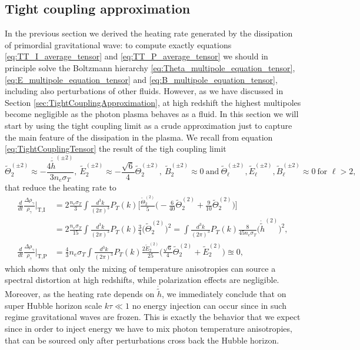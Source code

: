\subsection{Tight coupling approximation}
In the previous section we derived the heating rate generated by the dissipation of primordial gravitational wave: to compute exactly equations \eqref{eq:TT_I_average_tensor} and \eqref{eq:TT_P_average_tensor} we should in principle solve the Boltzmann hierarchy \eqref{eq:Theta_multipole_equation_tensor}, \eqref{eq:E_multipole_equation_tensor} and \eqref{eq:B_multipole_equation_tensor}, including also perturbations of other fluids. However, as we have discussed in Section \ref{sec:TightCouplingApproximation}, at high redshift the highest multipoles become negligible as the photon plasma behaves as a fluid. In this section we will start by using the tight coupling limit as a crude approximation just to capture the main feature of the dissipation in the plasma. We recall from equation \eqref{eq:TightCouplingTensor} the result of the tigh coupling limit
$$
\tilde\Theta_2^{(\pm2)}\approx-\frac{4\dot{\tilde h}^{(\pm2)}}{3n_e\sigma_T},\ \tilde E_2^{(\pm2)}\approx-\frac{\sqrt{6}}{4}\tilde\Theta_2^{(\pm2)},\ \tilde B_{2}^{(\pm2)}\approx0\ \text{and}\ \tilde \Theta_{\ell}^{(\pm2)},\tilde E_{\ell}^{(\pm2)},\tilde B_{\ell}^{(\pm2)}\approx 0\ \text{for }\ell>2,
$$
that reduce the heating rate to
\begin{align}\nonumber
    \frac{d}{dt}\frac{\Delta\rho_\gamma}{\rho_\gamma}\bigg|_\text{T,I}&=2\frac{n_e\sigma_T}{3}\int\frac{d^3k}{(2\pi)^3}{P}_T (k)\bigg[\frac{\tilde\Theta_2^{(2)}}{5}\bigg(-\frac{6}{40}\tilde \Theta_2^{(2)}+\frac{9}{10}\tilde\Theta_{2}^{(2)}\bigg)\bigg]\\\label{eq:HRI_tight}&=2\frac{n_e\sigma_T}{15}\int\frac{d^3k}{(2\pi)^3}{P}_T (k)\frac{3}{4}\Big(\tilde \Theta_2^{(2)}\Big)^2=\int\frac{d^3k}{(2\pi)^3}{P}_T (k)\frac{8}{45n_e\sigma_T}\Big(\dot{\tilde h}^{(2)}\Big)^2,\\
    \frac{d}{dt}\frac{\Delta\rho_\gamma}{\rho_\gamma}\bigg|_\text{T,P}&=\frac{4}{3}n_e\sigma_T\int\frac{d^3k}{(2\pi)^3}{P}_T (k)\frac{2\tilde E_2^{(2)}}{25}\bigg(\frac{\sqrt{6}}{4}\tilde\Theta_2^{(2)}+\tilde E_2^{(2)}\bigg)\approxeq0,\label{eq:HRP_tight}
\end{align}
which shows that only the mixing of temperature anisotropies can source a spectral distortion at high redshifts, while polarization effects are negligible. Moreover, as the heating rate depends on $\dot{\tilde h}$, we immediately conclude that on super Hubble horizon scale $k\tau\ll1$ no energy injection can occur since in such regime gravitational waves are frozen. This is exactly the behavior that we expect since in order to inject energy we have to mix photon temperature anisotropies, that can be sourced only after perturbations cross back the Hubble horizon.
